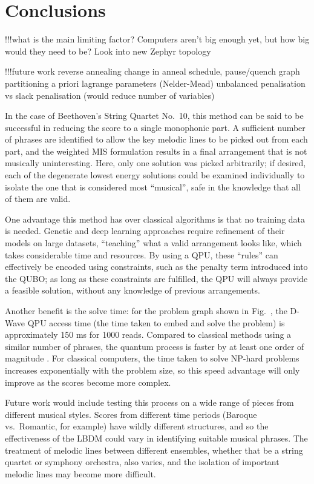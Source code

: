 \documentclass[12pt]{article}
\theoremstyle{definition}
\begin{document}
\section{Conclusions}

!!!what is the main limiting factor?
Computers aren't big enough yet, but how big would they need to be? Look into new Zephyr topology

!!!future work
reverse annealing
change in anneal schedule, pause/quench
graph partitioning
a priori lagrange parameters (Nelder-Mead)
unbalanced penalisation vs slack penalisation (would reduce number of variables)


In the case of Beethoven's String Quartet No.\ 10, this method can be said to be successful in reducing the score to a single monophonic part. A sufficient number of phrases are identified to allow the key melodic lines to be picked out from each part, and the weighted MIS formulation results in a final arrangement that is not musically uninteresting. Here, only one solution was picked arbitrarily; if desired, each of the degenerate lowest energy solutions could be examined individually to isolate the one that is considered most ``musical'', safe in the knowledge that all of them are valid.

One advantage this method has over classical algorithms is that no training data is needed. Genetic and deep learning approaches require refinement of their models on large datasets, ``teaching'' what a valid arrangement looks like, which takes considerable time and resources. By using a QPU, these ``rules'' can effectively be encoded using constraints, such as the penalty term introduced into the QUBO; as long as these constraints are fulfilled, the QPU will always provide a feasible solution, without any knowledge of previous arrangements.

Another benefit is the solve time: for the problem graph shown in Fig.\  , the D-Wave QPU access time (the time taken to embed and solve the problem) is approximately 150 ms for 1000 reads. Compared to classical methods using a similar number of phrases, the quantum process is faster by at least one order of magnitude . For classical computers, the time taken to solve NP-hard problems increases exponentially with the problem size, so this speed advantage will only improve as the scores become more complex.

Future work would include testing this process on a wide range of pieces from different musical styles. Scores from different time periods (Baroque vs.\ Romantic, for example) have wildly different structures, and so the effectiveness of the LBDM could vary in identifying suitable musical phrases. The treatment of melodic lines between different ensembles, whether that be a string quartet or symphony orchestra, also varies, and the isolation of important melodic lines may become more difficult.
\end{document}
